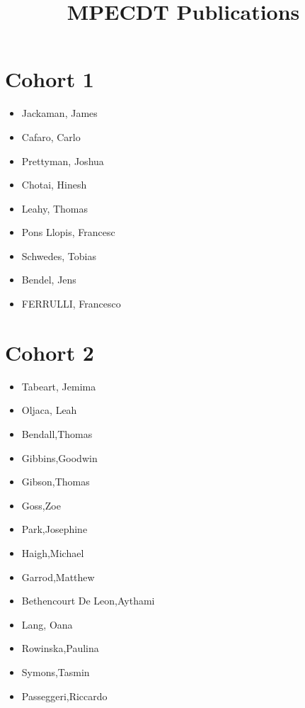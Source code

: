 \documentclass{article}
\title{MPECDT Publications}
\author{}
\date{}
\begin{document}
\maketitle
\section*{Cohort 1}
\begin{itemize}
    \item Jackaman, James \cite{jackaman2019design}
    \item Cafaro, Carlo \cite{cafaro2019added, cafaro2018characteristics}
    \item Prettyman, Joshua \cite{prettyman2018novel, prettyman2019generalized}
    \item Chotai, Hinesh \cite{chassagneux2017forward, chassagneux2017introduction, chassagneux2017mathematical, chassagneux2017description, chassagneux2017numerical}
    \item Leahy, Thomas \cite{leahy2018using}
    \item Pons Llopis, Francesc \cite{llopis2018particle, leahy2018using}
    \item Schwedes, Tobias \cite{schwedes2017mesh,schwedes2017introduction, schwedes2017application}
    \item Bendel, Jens
    \item FERRULLI, Francesco \cite{safronov2019eigenvalues}
\end{itemize}

\section*{Cohort 2}
\begin{itemize}
    \item Tabeart, Jemima \cite{tabeart2018conditioning, tabeart2020improving, tabeart2020impact}
    \item Oljaca, Leah \cite{oljaca2018almost}
    \item Bendall,Thomas \cite{bendall2020compatible, bendall2019recovered, bendall2019statistical}
    \item Gibbins,Goodwin \cite{gibbins2020entropy}
    \item Gibson,Thomas \cite{shipton2018higher, bendall2020compatible, gibson2020slate, gibson2019compatible}
    \item Goss,Zoe \cite{goss2020identifying,coles2021tidal}
    \item Park,Josephine
    \item Haigh,Michael \cite{haigh2018potential, haigh2020rossby}
    \item Garrod,Matthew \cite{garrod2018large}
    \item Bethencourt De Leon,Aythami \cite{de2020implications, alonso2020modelling ,alonso2019burgers, alonso2020well}
    \item Lang, Oana
    \item Rowinska,Paulina \cite{everitt2020delayed}
    \item Symons,Tasmin 
    \item Passeggeri,Riccardo \cite{passeggeri2020spectral, passeggeri2019mixing, passeggeri2019limit, passeggeri2020signature}
\end{itemize}
\end{document}
